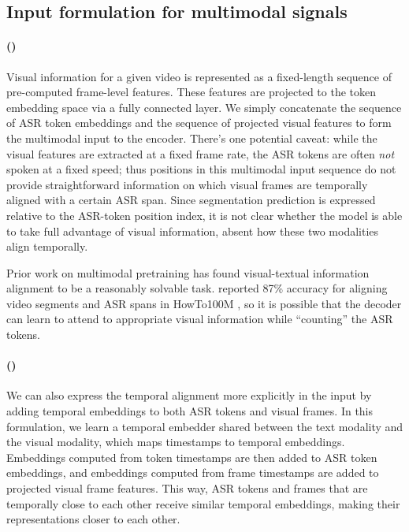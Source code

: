 \documentclass[11pt]{article}
\begin{document}
\subsection{Input formulation for multimodal signals}

\paragraph{\SimpleConcat (\SimpleConcatShort)}
Visual information for a given video is represented as a fixed-length sequence of pre-computed frame-level features.
These features are projected to the token embedding space via a fully connected layer.
We simply concatenate the sequence of ASR token embeddings and the sequence of projected visual features to form the multimodal input to the encoder.  There's one potential caveat: while the visual features are extracted at a fixed frame rate, the ASR tokens are often {\em not} spoken at a fixed speed; thus positions in this multimodal input sequence do not provide straightforward information on which visual frames are temporally aligned with a certain ASR span.  Since segmentation prediction is expressed relative to the ASR-token position index, it is not clear whether the model is able to take full advantage of visual information, absent how these two modalities align temporally.

Prior work on multimodal pretraining has found visual-textual information alignment to be a reasonably solvable task.
 reported 87\% accuracy for aligning video segments and ASR spans in HowTo100M \cite{miech2019howto100m}, so it is possible that the decoder can learn to attend to appropriate visual information while ``counting'' the ASR tokens.  


\paragraph{\TemporalEmb (\TemporalEmbShort)}
We can also express the temporal alignment more explicitly in the input by adding temporal embeddings to both ASR tokens and visual frames. 
In this formulation, we learn a temporal embedder shared between the text modality and the visual modality, which maps timestamps to temporal embeddings.  Embeddings computed from token timestamps are then added to ASR token embeddings, and embeddings computed from frame timestamps are added to projected visual frame features.  This way, ASR tokens and frames that are temporally close to each other receive similar temporal embeddings, making their representations closer to each other.
\end{document}

